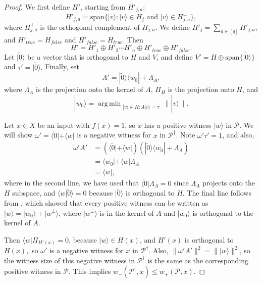 \documentclass[cleveref, autoref, thm-restate,11pt]{article}
\theoremstyle{definition}
\newcommand{\sop}[1]{{\mathcal #1}}
\newcommand{\ket}[1]{|#1\rangle}
\newcommand{\bra}[1]{\langle#1|}
\newcommand{\ketbra}[2]{|{#1}\rangle\!\langle{#2}|}
\newcommand{\braket}[2]{\langle{#1}|{#2}\rangle}
\DeclareMathOperator*{\argmin}{arg\,min}
\renewcommand{\wp}[2]{{w_+({#1},{#2})}}
\newcommand{\wm}[2]{{w_-({#1},{#2})}}
\begin{document}
\begin{proof}
We first define $H'$, starting from $H'_{j,a}$:
\begin{equation}
H'_{j,a}=\textrm{span}\{\ket{v}: \ket{v}\in H_j \textrm{ and } \ket{v}\in H_{j,a}^\perp\},
\end{equation}
where $H_{j,a}^\perp$ is the orthogonal complement of $H_{j,a}.$ We define $H'_j=\sum_{a\in [q]}H'_{j,a}$, and $H'_{true}=H_{false}$ and $H'_{false}=H_{true}$.
Then
\begin{equation}
H'=H'_1\oplus H'_2\cdots H'_n\oplus H'_{true}\oplus H'_{false}.
\end{equation}
Let $\ket{\tilde{0}}$ be a vector that is orthogonal to $H$ and $V$, and
define $V'=H\oplus\textrm{span}\{\ket{\tilde{0}}\}$ and $\tau'=\ket{\tilde{0}}.$
Finally, set
\begin{equation}
A'=\ketbra{\tilde{0}}{w_0}+\Lambda_A,
\end{equation}
where $\Lambda_A$ is the projection onto the kernel of $A$, $\Pi_H$ is the projection onto $H$, and 
\begin{equation}\label{eq:complement_min_wit}
\ket{w_0}=\argmin_{\substack{\ket{v}\in H: A\ket{v}=\tau}}\|\ket{v}\|.
\end{equation}

Let $x\in X$ be an input with $f(x)=1$, so $x$ has a positive witness
$\ket{w}$ in $\sop P$. We will show $\omega'=\bra{\tilde{0}}+\bra{w}$ is a negative
witness for $x$ in $\sop P^\dagger$. Note $\omega'\tau'=1$, and also,
\begin{align}
\omega' A'&=(\bra{\tilde{0}}+\bra{w})(\ketbra{\tilde{0}}{w_0}+\Lambda_A)\\
&=\bra{w_0}+\bra{w}\Lambda_A\\
&=\bra{w},
\end{align}
where in the second line, we have used that $\bra{\tilde{0}}\Lambda_A=0$ since
$\Lambda_A$ projects onto the $H$ subspace, 
and $\braket{w}{\tilde{0}}=0$ because $\ket{\tilde{0}}$ is orthogonal to $H$.
The final line follows from \cite[Definition
2.12]{itoApproximateSpanPrograms2019}, which showed that every positive
witness can be written as $\ket{w}=\ket{w_0}+\ket{w^\perp}$, where
$\ket{w^\perp}$ is in the kernel of $A$ and $\ket{w_0}$ is orthogonal to the
kernel of $A$. 

Then $\bra{w}\Pi_{H'(x)}=0$, because $\ket{w}\in H(x)$, and
$H'(x)$ is orthogonal to $H(x),$ so $\omega'$ is a negative witness for $x$ in
$\sop P^\dagger$.  Also, $\|\omega' A'\|^2=\|\ket{w}\|^2$, so the witness size of
this negative witness in $\sop P^\dagger$ is the same as the corresponding
positive witness in $\sop P.$ This implies $\wm{\sop P^\dagger}{x}\leq \wp{\sop P}{x}.$


\end{proof}
\end{document}
